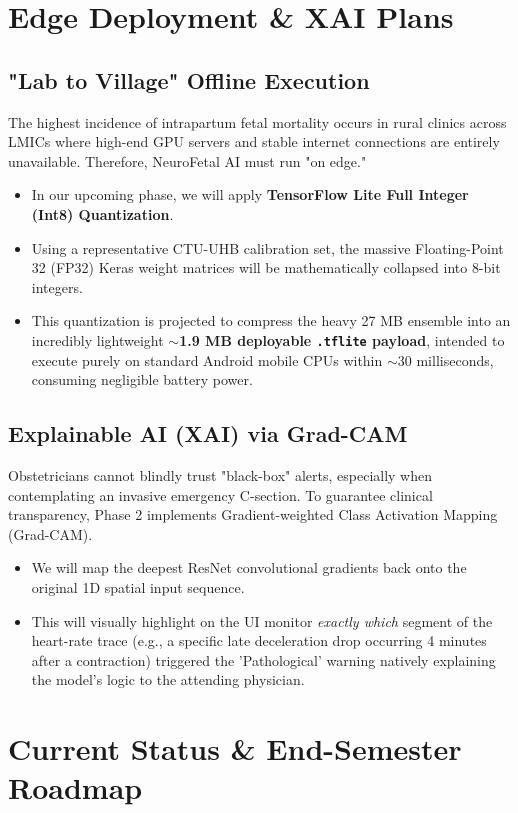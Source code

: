 \documentclass[12pt,a4paper]{report}
\begin{document}
\chapter{Edge Deployment \& XAI Plans}
\section{"Lab to Village" Offline Execution}
The highest incidence of intrapartum fetal mortality occurs in rural clinics across LMICs where high-end GPU servers and stable internet connections are entirely unavailable. Therefore, NeuroFetal AI must run "on edge."
\begin{itemize}
    \item In our upcoming phase, we will apply \textbf{TensorFlow Lite Full Integer (Int8) Quantization}.
    \item Using a representative CTU-UHB calibration set, the massive Floating-Point 32 (FP32) Keras weight matrices will be mathematically collapsed into 8-bit integers.
    \item This quantization is projected to compress the heavy 27 MB ensemble into an incredibly lightweight \textbf{$\sim$1.9 MB deployable \texttt{.tflite} payload}, intended to execute purely on standard Android mobile CPUs within $\sim$30 milliseconds, consuming negligible battery power.
\end{itemize}

\section{Explainable AI (XAI) via Grad-CAM}
Obstetricians cannot blindly trust "black-box" alerts, especially when contemplating an invasive emergency C-section. To guarantee clinical transparency, Phase 2 implements Gradient-weighted Class Activation Mapping (Grad-CAM). 
\begin{itemize}
    \item We will map the deepest ResNet convolutional gradients back onto the original 1D spatial input sequence.
    \item This will visually highlight on the UI monitor \textit{exactly which} segment of the heart-rate trace (e.g., a specific late deceleration drop occurring 4 minutes after a contraction) triggered the 'Pathological' warning natively explaining the model's logic to the attending physician.
\end{itemize}

\chapter{Current Status \& End-Semester Roadmap}
\end{document}
